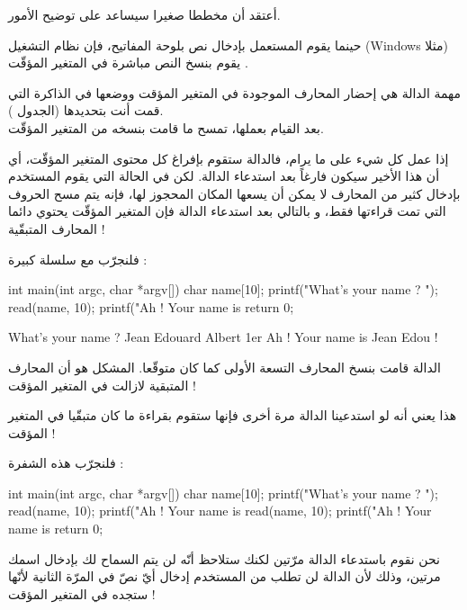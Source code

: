 أعتقد أن مخططا صغيرا سيساعد على توضيح الأمور.


حينما يقوم المستعمل بإدخال نص بلوحة المفاتيح، فإن نظام التشغيل 
(\textenglish{Windows}
مثلا) يقوم بنسخ النص مباشرة في المتغير المؤقّت
.

مهمة الدالة
هي إحضار المحارف الموجودة في المتغير المؤقت ووضعها في الذاكرة التي قمت أنت بتحديدها (الجدول
).\\
بعد القيام بعملها، تمسح ما قامت بنسخه من المتغير المؤقّت.

إذا عمل كل شيء على ما يرام، فالدالة
ستقوم بإفراغ كل محتوى المتغير المؤقّت، أي أن هذا الأخير سيكون فارغاً بعد استدعاء الدالة. لكن في الحالة التي يقوم المستخدم بإدخال كثير من المحارف لا يمكن أن يسعها المكان المحجوز لها، فإنه يتم مسح الحروف التي تمت قراءتها فقط، و بالتالي بعد استدعاء الدالة
فإن المتغير المؤقّت يحتوي دائما المحارف المتبقّية !

فلنجرّب مع سلسلة كبيرة :

\begin{Csource}
  int main(int argc, char *argv[])
  {
  	char name[10];
  	printf("What's your name ? ");
  	read(name, 10);
  	printf("Ah ! Your name is %
  	return 0;
  }
\end{Csource}

\begin{Console}
  What's your name ? Jean Edouard Albert 1er
  Ah ! Your name is Jean Edou !
\end{Console}

الدالة
قامت بنسخ المحارف التسعة الأولى كما كان متوقّعا. المشكل هو أن المحارف المتبقية لازالت في المتغير المؤقت !


هذا يعني أنه لو استدعينا الدالة
مرة أخرى فإنها ستقوم بقراءة ما كان متبقّيا في المتغير المؤقت !

فلنجرّب هذه الشفرة :

\begin{Csource}
int main(int argc, char *argv[])
{
 	char name[10];
 	printf("What's your name ? ");
 	read(name, 10);
 	printf("Ah ! Your name is %
 	read(name, 10);
 	printf("Ah ! Your name is %
 	return 0;
}
\end{Csource}

نحن نقوم باستدعاء الدالة
مرّتين لكنك ستلاحظ أنّه لن يتم السماح لك بإدخال اسمك مرتين، وذلك لأن الدالة
لن تطلب من المستخدم إدخال أيّ نصّ في المرّة الثانية لأنّها ستجده في المتغير المؤقت !


